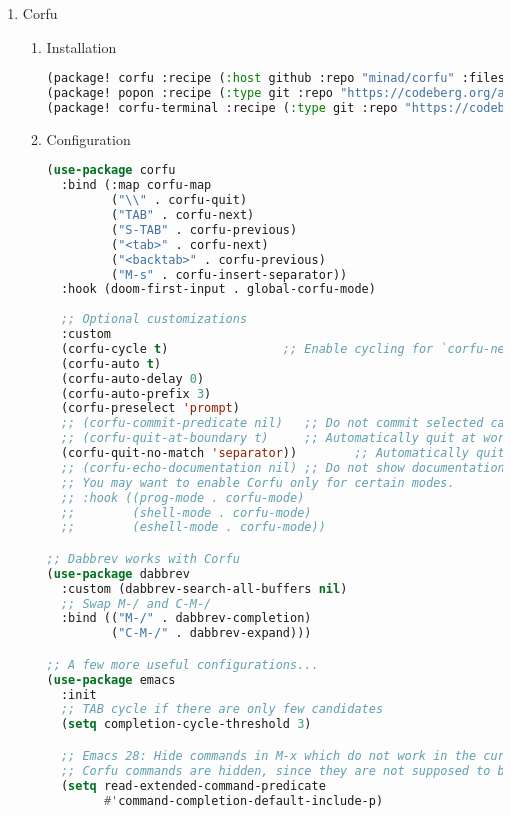 \documentclass[11pt]{article}
\begin{document}
\begin{enumerate}
  \item Corfu
  \label{sec:corfu}

  
\begin{enumerate}
  \item Installation
  \label{sec:installation-1}

  \begin{lstlisting}[language=Lisp]
(package! corfu :recipe (:host github :repo "minad/corfu" :files ("*.el" "extensions/*.el")))
(package! popon :recipe (:type git :repo "https://codeberg.org/akib/emacs-popon.git"))
(package! corfu-terminal :recipe (:type git :repo "https://codeberg.org/akib/emacs-corfu-terminal.git"))
\end{lstlisting}
  \item Configuration
  \label{sec:configuration-1}

  \begin{lstlisting}[language=Lisp]
(use-package corfu
  :bind (:map corfu-map
         ("\\" . corfu-quit)
         ("TAB" . corfu-next)
         ("S-TAB" . corfu-previous)
         ("<tab>" . corfu-next)
         ("<backtab>" . corfu-previous)
         ("M-s" . corfu-insert-separator))
  :hook (doom-first-input . global-corfu-mode)
  
  ;; Optional customizations
  :custom
  (corfu-cycle t)                ;; Enable cycling for `corfu-next/previous'
  (corfu-auto t)
  (corfu-auto-delay 0)
  (corfu-auto-prefix 3)
  (corfu-preselect 'prompt)
  ;; (corfu-commit-predicate nil)   ;; Do not commit selected candidates on next input
  ;; (corfu-quit-at-boundary t)     ;; Automatically quit at word boundary
  (corfu-quit-no-match 'separator))        ;; Automatically quit if there is no match
  ;; (corfu-echo-documentation nil) ;; Do not show documentation in the echo area
  ;; You may want to enable Corfu only for certain modes.
  ;; :hook ((prog-mode . corfu-mode)
  ;;        (shell-mode . corfu-mode)
  ;;        (eshell-mode . corfu-mode))

;; Dabbrev works with Corfu
(use-package dabbrev
  :custom (dabbrev-search-all-buffers nil)
  ;; Swap M-/ and C-M-/
  :bind (("M-/" . dabbrev-completion)
         ("C-M-/" . dabbrev-expand)))

;; A few more useful configurations...
(use-package emacs
  :init
  ;; TAB cycle if there are only few candidates
  (setq completion-cycle-threshold 3)

  ;; Emacs 28: Hide commands in M-x which do not work in the current mode.
  ;; Corfu commands are hidden, since they are not supposed to be used via M-x.
  (setq read-extended-command-predicate
        #'command-completion-default-include-p)


\end{lstlisting}
\end{enumerate}
\end{enumerate}
\end{document}
